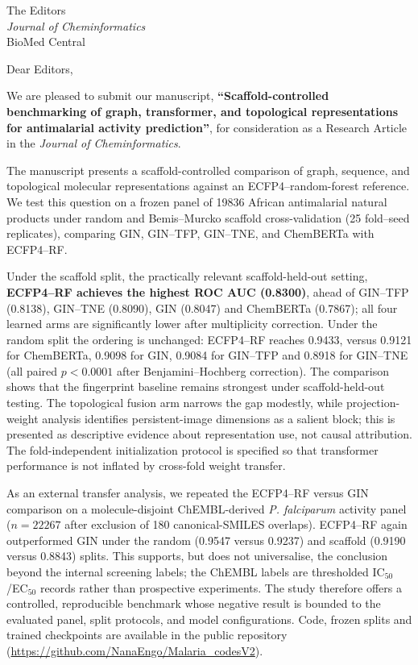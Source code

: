 \documentclass[11pt,a4paper]{letter}
\begin{document}
\begin{letter}{%
  The Editors \\
  \textit{Journal of Cheminformatics} \\
  BioMed Central
}

\opening{Dear Editors,}

We are pleased to submit our manuscript, \textbf{``Scaffold-controlled benchmarking of graph, transformer, and topological representations for antimalarial activity prediction''}, for consideration as a Research Article in the \textit{Journal of Cheminformatics}.

The manuscript presents a scaffold-controlled comparison of graph, sequence, and topological molecular representations against an ECFP4--random-forest reference. We test this question on a frozen panel of \num{19836} African antimalarial natural products under random and Bemis--Murcko scaffold cross-validation (\num{25} fold--seed replicates), comparing GIN, GIN--TFP, GIN--TNE, and ChemBERTa with ECFP4--RF.

Under the scaffold split, the practically relevant scaffold-held-out setting, \textbf{ECFP4--RF achieves the highest ROC AUC (\num{0.8300})}, ahead of GIN--TFP (\num{0.8138}), GIN--TNE (\num{0.8090}), GIN (\num{0.8047}) and ChemBERTa (\num{0.7867}); all four learned arms are significantly lower after multiplicity correction. Under the random split the ordering is unchanged: ECFP4--RF reaches \num{0.9433}, versus \num{0.9121} for ChemBERTa, \num{0.9098} for GIN, \num{0.9084} for GIN--TFP and \num{0.8918} for GIN--TNE (all paired $p < \num{0.0001}$ after Benjamini--Hochberg correction). The comparison shows that the fingerprint baseline remains strongest under scaffold-held-out testing. The topological fusion arm narrows the gap modestly, while projection-weight analysis identifies persistent-image dimensions as a salient block; this is presented as descriptive evidence about representation use, not causal attribution. The fold-independent initialization protocol is specified so that transformer performance is not inflated by cross-fold weight transfer.

As an external transfer analysis, we repeated the ECFP4--RF versus GIN comparison on a molecule-disjoint ChEMBL-derived \textit{P. falciparum} activity panel ($n=\num{22267}$ after exclusion of \num{180} canonical-SMILES overlaps). ECFP4--RF again outperformed GIN under the random (\num{0.9547} versus \num{0.9237}) and scaffold (\num{0.9190} versus \num{0.8843}) splits. This supports, but does not universalise, the conclusion beyond the internal screening labels; the ChEMBL labels are thresholded IC$_{50}$/EC$_{50}$ records rather than prospective experiments. The study therefore offers a controlled, reproducible benchmark whose negative result is bounded to the evaluated panel, split protocols, and model configurations. Code, frozen splits and trained checkpoints are available in the public repository (\url{https://github.com/NanaEngo/Malaria_codesV2}).


\end{letter}
\end{document}

